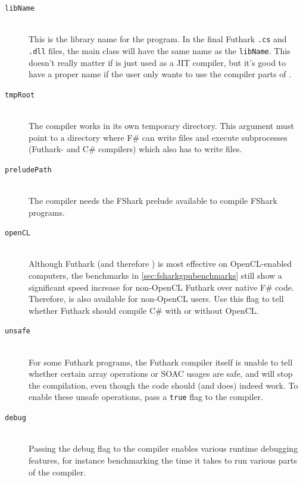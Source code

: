 \begin{description}
\item[\texttt{libName}]\hfill\\
  This is the library name for the \fshark{} program. In the final Futhark
  \texttt{.cs} and \texttt{.dll} files, the main class will have the same name
  as the \texttt{libName}. This doesn't really matter if \fshark{} is just used
  as a JIT compiler, but it's good to have a proper name if the user only wants
  to use the compiler parts of \fshark{}.

\item[\texttt{tmpRoot}]\hfill\\
  The \fshark{} compiler works in its own temporary directory. This argument must
  point to a directory where F\# can write files and execute subprocesses
  (Futhark- and C\# compilers) which also has to write files.
  
\item[\texttt{preludePath}]\hfill\\
  The \fshark{} compiler needs the FShark prelude available to compile FShark
  programs. 

\item[\texttt{openCL}]\hfill\\
  Although Futhark (and therefore \fshark{}) is most effective on OpenCL-enabled
  computers, the benchmarks in \ref{sec:fsharkgpubenchmarks} still show a significant
  speed increase for non-OpenCL Futhark over native F\# code.
  Therefore, \fshark{} is also available for non-OpenCL users. Use this flag to
  tell \fshark{} whether Futhark should compile C\# with or without OpenCL.
  
\item[\texttt{unsafe}]\hfill\\
  For some Futhark programs, the Futhark compiler itself is unable to tell
  whether certain array operations or SOAC usages are safe, and will stop the
  compilation, even though the code should (and does) indeed work.
  To enable these unsafe operations, pass a \texttt{true} flag to the compiler.

\item[\texttt{debug}]\hfill\\
  Passing the debug flag to the \fshark{} compiler enables various runtime
  debugging features, for instance benchmarking the time it takes to run various
  parts of the compiler.
\end{description}

